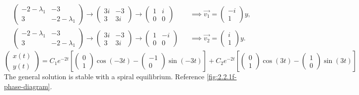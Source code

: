 \documentclass[12pt]{article}
\begin{document}
\begin{equation*}
  \begin{aligned}
    &\begin{pmatrix}-2-\lambda_1&-3\\3&-2-\lambda_1\end{pmatrix}
    \rightarrow\begin{pmatrix}3i&-3\\3&3i\end{pmatrix}
    \rightarrow\begin{pmatrix}1&i\\0&0\end{pmatrix}
    &&\implies \vec{v_1} = \begin{pmatrix}-i\\1\end{pmatrix}y, \\
    &\begin{pmatrix}-2-\lambda_1&-3\\3&-2-\lambda_1\end{pmatrix}
    \rightarrow\begin{pmatrix}3i&-3\\3&3i\end{pmatrix}
    \rightarrow\begin{pmatrix}1&-i\\0&0\end{pmatrix}
    &&\implies \vec{v_2} = \begin{pmatrix}i\\1\end{pmatrix}y.
  \end{aligned}
\end{equation*}
$$
\boxed{\begin{pmatrix}x(t)\\y(t)\end{pmatrix}=C_1e^{-2t}\left[\begin{pmatrix}0\\1\end{pmatrix}\cos(-3t)
    -\begin{pmatrix}-1\\0\end{pmatrix}\sin(-3t)\right]+
  C_2e^{-2t}\left[\begin{pmatrix}0\\1\end{pmatrix}\cos(3t)
    -\begin{pmatrix}1\\0\end{pmatrix}\sin(3t)\right]}
$$
The general solution is stable with a spiral equilibrium. Reference
\cref{fig:2.2.1f-phase-diagram}.
\end{document}
